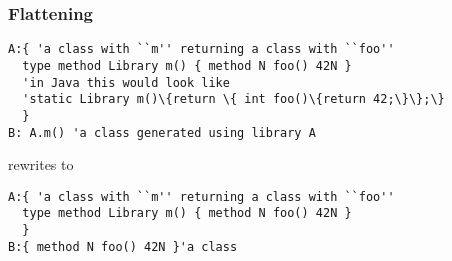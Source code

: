 


\begin{frame}[fragile]
\frametitle{Flattening}
\begin{NiceCode}{59ex}{1}
\begin{lstlisting}
A:{ 'a class with ``m'' returning a class with ``foo''
  type method Library m() { method N foo() 42N }
  'in Java this would look like 
  'static Library m()\{return \{ int foo()\{return 42;\}\};\}
  }
B: A.m() 'a class generated using library A
\end{lstlisting}
\end{NiceCode}
rewrites to 

\begin{NiceCode}{59ex}{1}
\begin{lstlisting}
A:{ 'a class with ``m'' returning a class with ``foo''
  type method Library m() { method N foo() 42N }
  }
B:{ method N foo() 42N }'a class 
\end{lstlisting}
\end{NiceCode}
\end{frame}

